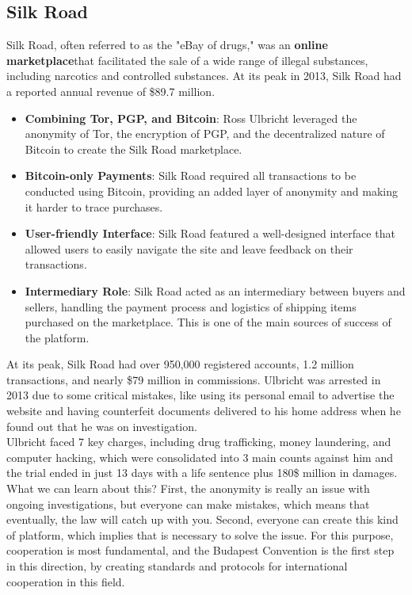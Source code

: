 \subsection{Silk Road}
Silk Road, often referred to as the "eBay of drugs," was an
\textbf{online marketplace}that facilitated the sale of a wide range
of illegal substances, including narcotics and controlled substances.
At its peak in 2013, Silk Road had a reported annual revenue of \$89.7
million.
\begin{itemize}
  \item \textbf{Combining Tor, PGP, and Bitcoin}: Ross Ulbricht
    leveraged the anonymity of Tor, the encryption of PGP, and the
    decentralized nature of Bitcoin to create the Silk Road marketplace. 
  \item \textbf{Bitcoin-only Payments}: Silk Road required all
    transactions to be conducted using Bitcoin, providing an added layer
    of anonymity and making it harder to trace purchases.
  \item \textbf{User-friendly Interface}: Silk Road featured a well-designed
    interface that allowed users to easily navigate the site and leave
    feedback on their transactions.
  \item \textbf{Intermediary Role}: Silk Road acted as an intermediary
    between buyers and sellers, handling the payment process and
    logistics of shipping items purchased on the marketplace. This is
    one of the main sources of success of the platform.
\end{itemize}
At its peak, Silk Road had over 950,000 registered accounts, 1.2
million transactions, and nearly \$79 million in commissions. Ulbricht
was arrested in 2013 due to some critical mistakes, like using its
personal email to advertise the website and having counterfeit
documents delivered to his home address when he found out that he was
on investigation.\\
Ulbricht faced 7 key charges, including drug trafficking,
money laundering, and computer hacking, which were consolidated into 3
main counts against him and the trial ended in just 13 days with a
life sentence plus 180\$ million in damages.\\
What we can learn about this? First, the anonymity is really an issue
with ongoing investigations, but everyone can make mistakes, which
means that eventually, the law will catch up with you. Second,
everyone can create this kind of platform, which implies that is
necessary to solve the issue. For this purpose, cooperation is most
fundamental, and the Budapest Convention is the first step in this 
direction, by creating standards and protocols for international
cooperation in this field.

